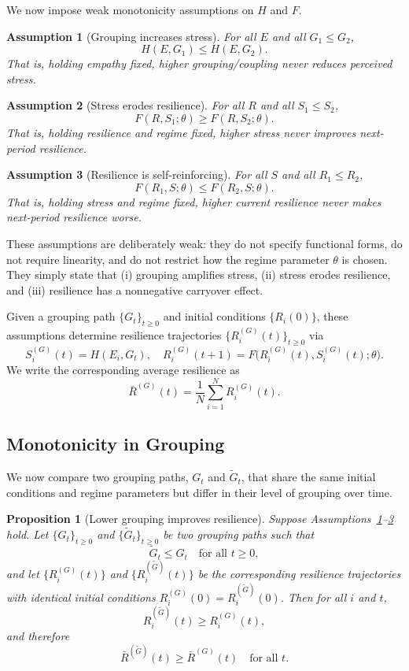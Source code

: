 \documentclass[11pt]{article}
\theoremstyle{plain}
\newtheorem{assumption}{Assumption}
\newtheorem{proposition}{Proposition}
\begin{document}
We now impose weak monotonicity assumptions on $H$ and $F$.

\begin{assumption}[Grouping increases stress]
\label{ass:group-stress}
For all $E$ and all $G_1 \le G_2$,
\[
H(E,G_1) \le H(E,G_2).
\]
That is, holding empathy fixed, higher grouping/coupling never reduces perceived stress.
\end{assumption}

\begin{assumption}[Stress erodes resilience]
\label{ass:stress-resilience}
For all $R$ and all $S_1 \le S_2$,
\[
F(R,S_1;\theta) \ge F(R,S_2;\theta).
\]
That is, holding resilience and regime fixed, higher stress never improves next-period resilience.
\end{assumption}

\begin{assumption}[Resilience is self-reinforcing]
\label{ass:res-monotone}
For all $S$ and all $R_1 \le R_2$,
\[
F(R_1,S;\theta) \le F(R_2,S;\theta).
\]
That is, holding stress and regime fixed, higher current resilience never makes next-period resilience worse.
\end{assumption}

These assumptions are deliberately weak: they do not specify functional forms, do not require linearity, and do not restrict how the regime parameter $\theta$ is chosen.
They simply state that (i) grouping amplifies stress, (ii) stress erodes resilience, and (iii) resilience has a nonnegative carryover effect.

Given a grouping path $\{G_t\}_{t\ge 0}$ and initial conditions $\{R_i(0)\}$, these assumptions determine resilience trajectories $\{R_i^{(G)}(t)\}_{t\ge 0}$ via
\[
S_i^{(G)}(t) = H(E_i, G_t), \quad
R_i^{(G)}(t+1) = F\bigl(R_i^{(G)}(t), S_i^{(G)}(t); \theta\bigr).
\]
We write the corresponding average resilience as
\[
\bar{R}^{(G)}(t) = \frac{1}{N}\sum_{i=1}^N R_i^{(G)}(t).
\]

\subsection{Monotonicity in Grouping}

We now compare two grouping paths, $G_t$ and $\tilde{G}_t$, that share the same initial conditions and regime parameters but differ in their level of grouping over time.

\begin{proposition}[Lower grouping improves resilience]
\label{prop:grouping}
Suppose Assumptions~\ref{ass:group-stress}--\ref{ass:res-monotone} hold.
Let $\{G_t\}_{t\ge 0}$ and $\{\tilde{G}_t\}_{t\ge 0}$ be two grouping paths such that
\[
\tilde{G}_t \le G_t \quad \text{for all } t \ge 0,
\]
and let $\{R_i^{(G)}(t)\}$ and $\{R_i^{(\tilde{G})}(t)\}$ be the corresponding resilience trajectories with identical initial conditions $R_i^{(G)}(0)=R_i^{(\tilde{G})}(0)$.
Then for all $i$ and $t$,
\[
R_i^{(\tilde{G})}(t) \ge R_i^{(G)}(t),
\]
and therefore
\[
\bar{R}^{(\tilde{G})}(t) \ge \bar{R}^{(G)}(t) \quad \text{for all } t.
\]
\end{proposition}
\end{document}
